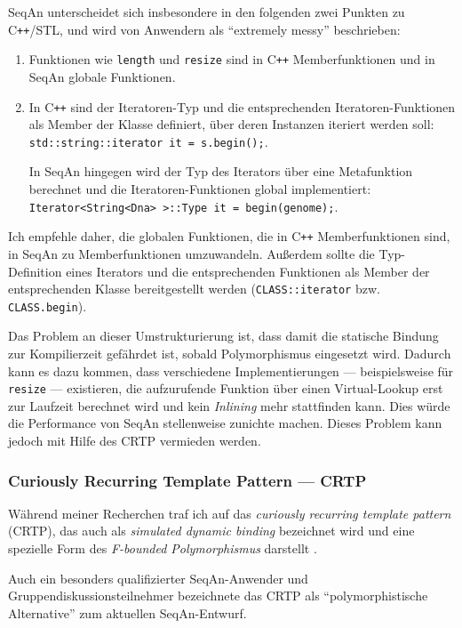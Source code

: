 SeqAn unterscheidet sich insbesondere in den folgenden zwei Punkten zu C\texttt{++}/STL, und wird von Anwendern als ``extremely messy'' beschrieben: 
\begin{enumerate}
  \item Funktionen wie \texttt{length} und \texttt{resize} sind in C\texttt{++} Memberfunktionen und in SeqAn globale Funktionen.
  \item In C\texttt{++} sind der Iteratoren-Typ und die entsprechenden Iteratoren-Funktionen als Member der Klasse definiert, über deren Instanzen iteriert werden soll: \texttt{std::string::iterator it = s.begin();}.
  
  In SeqAn hingegen wird der Typ des Iterators über eine Metafunktion berechnet und die Iteratoren-Funktionen global implementiert: \texttt{Iterator<String<Dna> >::Type it = begin(genome);}.
\end{enumerate}

Ich empfehle daher, die globalen Funktionen, die in C\texttt{++} Memberfunktionen sind, in SeqAn zu Memberfunktionen umzuwandeln. Außerdem sollte die Typ-Definition eines Iterators und die entsprechenden Funktionen als Member der entsprechenden Klasse bereitgestellt werden (\texttt{CLASS::iterator} bzw. \texttt{CLASS.begin}).

Das Problem an dieser Umstrukturierung ist, dass damit die statische Bindung zur Kompilierzeit gefährdet ist, sobald Polymorphismus eingesetzt wird. Dadurch kann es dazu kommen, dass verschiedene Implementierungen --- beispielsweise für \texttt{resize} --- existieren, die aufzurufende Funktion über einen Virtual-Lookup erst zur Laufzeit berechnet wird und kein \textit{Inlining} mehr stattfinden kann. Dies würde die Performance von SeqAn stellenweise zunichte machen. Dieses Problem kann jedoch mit Hilfe des CRTP vermieden werden.
    

\subsubsection{Curiously Recurring Template Pattern --- CRTP}
\label{sec:verbesserung-crtp}

Während meiner Recherchen traf ich auf das \textit{curiously recurring template pattern} (CRTP), das auch als \textit{simulated dynamic binding} bezeichnet wird und eine spezielle Form des \textit{F-bounded Polymorphismus} darstellt \citep{Canning:1989fp}.

Auch ein besonders qualifizierter SeqAn-Anwender und Gruppendiskussionsteilnehmer bezeichnete das CRTP als ``polymorphistische Alternative'' zum aktuellen SeqAn-Entwurf.

